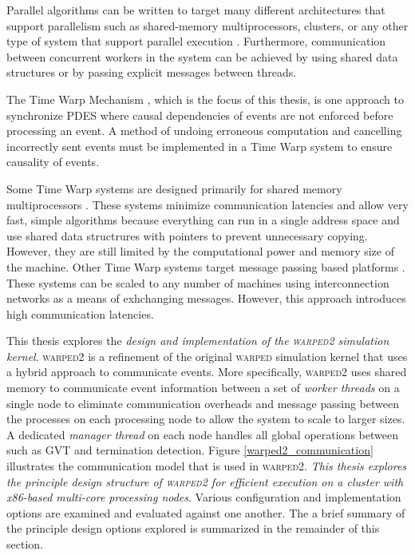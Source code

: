 \documentclass[11pt]{book}
\begin{document}
Parallel algorithms can be written to target many different architectures that support parallelism
such as shared-memory multiprocessors, clusters, or any other type of system that support parallel
execution \cite{culler-97,patterson-11}.  Furthermore, communication between concurrent workers in
the system can be achieved by using shared data structures or by passing explicit messages between
threads.

The Time Warp Mechanism \cite{jefferson-85,fujimoto-90}, which is the focus of this thesis, is one
approach to synchronize PDES where causal dependencies of events are not enforced before processing
an event.  A method of undoing erroneous computation and cancelling incorrectly sent events must be
implemented in a Time Warp system to ensure causality of events.

Some Time Warp systems are designed primarily for shared memory multiprocessors \cite{das-94}.
These systems minimize communication latencies and allow very fast, simple algorithms because
everything can run in a single address space and use shared data structrures with pointers to
prevent unnecessary copying.  However, they are still limited by the computational power and memory
size of the machine.  Other Time Warp systems target message passing based platforms
\cite{carothers-00,ramanan-98-iscope}.  These systems can be scaled to any number of machines using
interconnection networks as a means of exhchanging messages.  However, this approach introduces high
communication latencies.

This thesis explores the \emph{design and implementation of the \textsc{warped2} simulation kernel}.
\textsc{warped2} is a refinement of the original \textsc{warped} simulation kernel
\cite{martin-96,ramanan-98-iscope} that uses a hybrid approach to communicate events.  More
specifically, \textsc{warped2} uses shared memory to communicate event information between a set of
\emph{worker threads} on a single node to eliminate communication overheads and message passing
between the processes on each processing node to allow the system to scale to larger sizes.  A
dedicated \emph{manager thread} on each node handles all global operations between such as GVT and
termination detection.  Figure \ref{warped2_communication} illustrates the communication model that
is used in \textsc{warped2}.  \emph{This thesis explores the principle design structure of
\textsc{warped2} for efficient execution on a cluster with x86-based multi-core processing nodes}.
Various configuration and implementation options are examined and evaluated against one another.
The a brief summary of the principle design options explored is summarized in the remainder of this
section.
\end{document}
